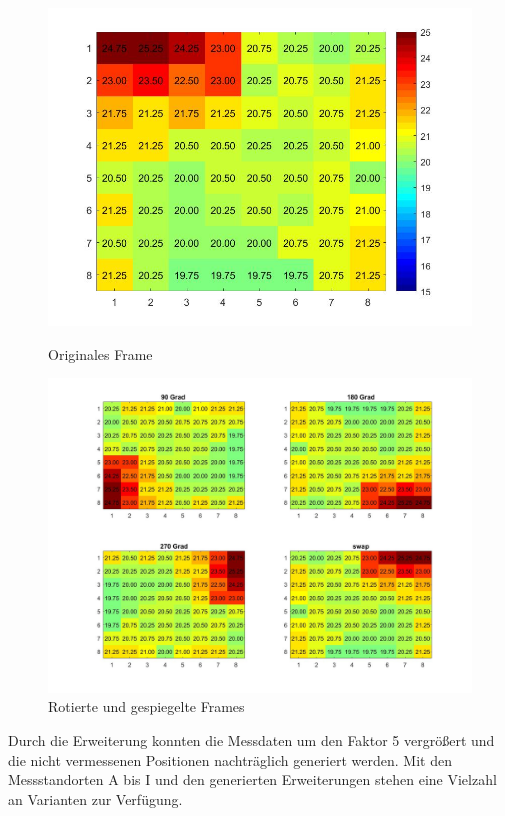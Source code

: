 \begin{figure}[!ht]
	\centering
	\begin{minipage}[c]{0.35\linewidth}
	\centering
	\includegraphics[width=.8\linewidth]{fig/original}
	\caption{Originales Frame}
	\label{fig:original}
	\end{minipage}
	\hfill
	\begin{minipage}[c]{0.6\linewidth  }
\includegraphics[width=1\linewidth]{fig/rotated}
\caption{Rotierte und gespiegelte Frames}
\label{fig:rotated}
	\end{minipage}
\end{figure}


Durch die Erweiterung konnten die Messdaten um den Faktor 5 vergrößert und die nicht vermessenen Positionen nachträglich generiert werden. Mit den Messstandorten A bis I und den generierten Erweiterungen stehen eine Vielzahl an Varianten zur Verfügung. 


